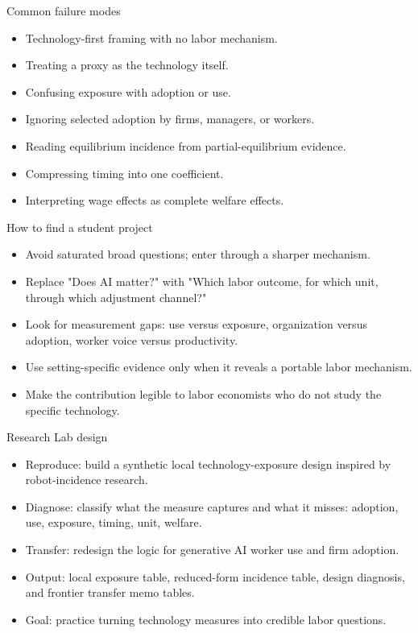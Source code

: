 \documentclass[aspectratio=169,11pt]{beamer}
\begin{document}
\begin{frame}{Common failure modes}
\begin{itemize}
    \item Technology-first framing with no labor mechanism.
    \item Treating a proxy as the technology itself.
    \item Confusing exposure with adoption or use.
    \item Ignoring selected adoption by firms, managers, or workers.
    \item Reading equilibrium incidence from partial-equilibrium evidence.
    \item Compressing timing into one coefficient.
    \item Interpreting wage effects as complete welfare effects.
\end{itemize}
\end{frame}

\begin{frame}{How to find a student project}
\begin{itemize}
    \item Avoid saturated broad questions; enter through a sharper mechanism.
    \item Replace "Does AI matter?" with "Which labor outcome, for which unit, through which adjustment channel?"
    \item Look for measurement gaps: use versus exposure, organization versus adoption, worker voice versus productivity.
    \item Use setting-specific evidence only when it reveals a portable labor mechanism.
    \item Make the contribution legible to labor economists who do not study the specific technology.
\end{itemize}
\end{frame}

\begin{frame}{Research Lab design}
\begin{itemize}
    \item Reproduce: build a synthetic local technology-exposure design inspired by robot-incidence research.
    \item Diagnose: classify what the measure captures and what it misses: adoption, use, exposure, timing, unit, welfare.
    \item Transfer: redesign the logic for generative AI worker use and firm adoption.
    \item Output: local exposure table, reduced-form incidence table, design diagnosis, and frontier transfer memo tables.
    \item Goal: practice turning technology measures into credible labor questions.
\end{itemize}
\end{frame}
\end{document}
